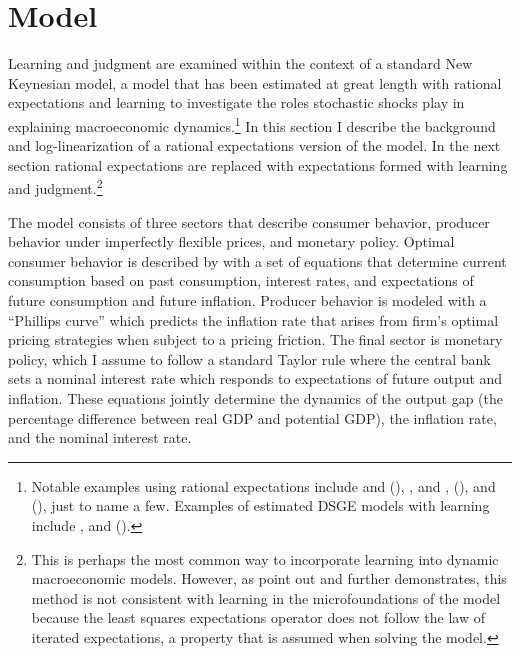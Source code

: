 \documentclass[12pt]{article}
\newcommand{\citee}[1]{\citet{#1}}
\begin{document}
\section{Model}\label{s:nk}
Learning and judgment are examined within the context of a standard New Keynesian model, a model that has been estimated at great length with rational expectations and learning to investigate the roles stochastic shocks play in explaining macroeconomic dynamics.\footnote{Notable examples using rational expectations include \citee{ireland2004} and (\citeyear{ireland_tech_2004}), \citee{nasonsmith2005}, and \citee{smetswouters2003}, (\citeyear{smetswouters2005}), and (\citeyear{smetswouters2007}), just to name a few.  Examples of estimated DSGE models with learning include \citee{milani2007}, \citee{slobodyan_wouters_2007} and (\citeyear{slobodyan_wouters_2008}).}  In this section I describe the background and log-linearization of a rational expectations version of the model.  In the next section rational expectations are replaced with expectations formed with learning and judgment.\footnote{This is perhaps the most common way to incorporate learning into dynamic macroeconomic models.  However, as \citee{marcetsargent1989} point out and \citee{preston2005} further demonstrates, this method is not consistent with learning in the microfoundations of the model because the least squares expectations operator does not follow the law of iterated expectations, a property that is assumed when solving the model.}

The model consists of three sectors that describe consumer behavior, producer behavior under imperfectly flexible prices, and monetary policy.  Optimal consumer behavior is described by with a set of equations that determine current consumption based on past consumption, interest rates, and expectations of future consumption and future inflation.  Producer behavior is modeled with a ``Phillips curve'' which predicts the inflation rate that arises from firm's optimal pricing strategies when subject to a pricing friction.  The final sector is monetary policy, which I assume to follow a standard Taylor rule where the central bank sets a nominal interest rate which responds to expectations of future output and inflation.  These equations jointly determine the dynamics of the output gap (the percentage difference between real GDP and potential GDP), the inflation rate, and the nominal interest rate.  
\end{document}
